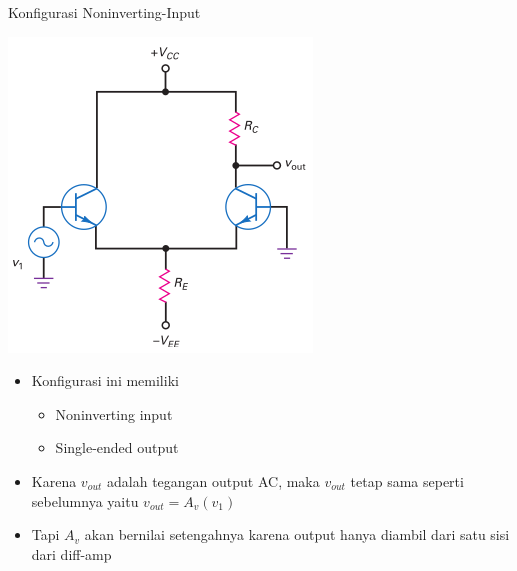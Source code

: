 \documentclass[aspectratio=169]{beamer}
\begin{document}
\begin{frame}{Konfigurasi Noninverting-Input}
	\begin{multicols}{2}
		\begin{center}
			\includegraphics[height=0.7\textheight]{gambar/01.diff-amp/01.noninverting_input+single-ended_output}
		\end{center}
		\columnbreak
		\begin{itemize}
			\item Konfigurasi ini memiliki
			\begin{itemize}
				\item Noninverting input
				\item Single-ended output
			\end{itemize}
			\item Karena $ v_{out} $ adalah tegangan output AC, maka $ v_{out} $ tetap sama seperti sebelumnya yaitu $ v_{out} = A_v (v_1) $
		\end{itemize}
		\begin{itemize}
			\item Tapi $ A_v $ akan bernilai setengahnya karena output hanya diambil dari satu sisi dari diff-amp
		\end{itemize}
	\end{multicols}
\end{frame}
\end{document}
